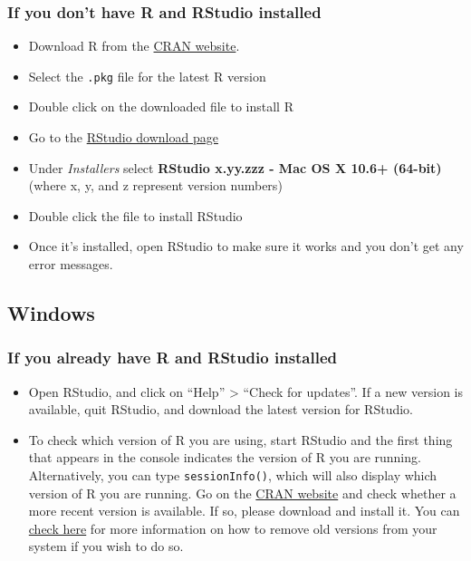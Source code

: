 \documentclass[]{book}
\providecommand{\tightlist}{%
  \setlength{\itemsep}{0pt}\setlength{\parskip}{0pt}}
\theoremstyle{definition}
\theoremstyle{definition}
\theoremstyle{definition}
\theoremstyle{remark}
\begin{document}
\subsubsection*{If you don't have R and RStudio
installed}\label{if-you-dont-have-r-and-rstudio-installed}

\begin{itemize}
\tightlist
\item
  Download R from the \href{http://cran.r-project.org/bin/macosx}{CRAN
  website}.
\item
  Select the \texttt{.pkg} file for the latest R version
\item
  Double click on the downloaded file to install R
\item
  Go to the
  \href{https://www.rstudio.com/products/rstudio/download/\#download}{RStudio
  download page}
\item
  Under \emph{Installers} select \textbf{RStudio x.yy.zzz - Mac OS X
  10.6+ (64-bit)} (where x, y, and z represent version numbers)
\item
  Double click the file to install RStudio
\item
  Once it's installed, open RStudio to make sure it works and you don't
  get any error messages.
\end{itemize}

\subsection*{Windows}\label{windows}

\subsubsection*{If you already have R and RStudio
installed}\label{if-you-already-have-r-and-rstudio-installed-1}

\begin{itemize}
\tightlist
\item
  Open RStudio, and click on ``Help'' \textgreater{} ``Check for
  updates''. If a new version is available, quit RStudio, and download
  the latest version for RStudio.
\item
  To check which version of R you are using, start RStudio and the first
  thing that appears in the console indicates the version of R you are
  running. Alternatively, you can type \texttt{sessionInfo()}, which
  will also display which version of R you are running. Go on the
  \href{https://cran.r-project.org/bin/windows/base/}{CRAN website} and
  check whether a more recent version is available. If so, please
  download and install it. You can
  \href{https://cran.r-project.org/bin/windows/base/rw-FAQ.html\#How-do-I-UNinstall-R_003f}{check
  here} for more information on how to remove old versions from your
  system if you wish to do so.
\end{itemize}
\end{document}
